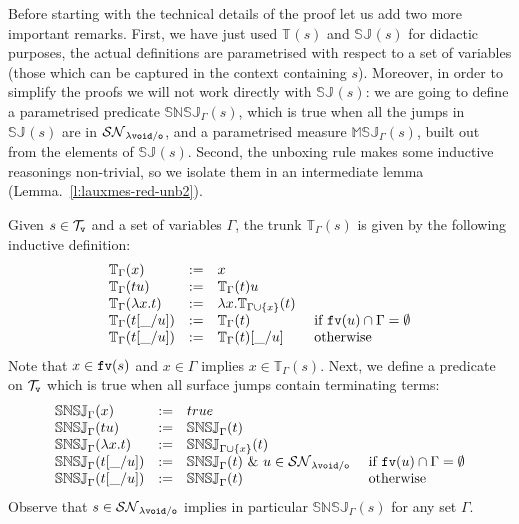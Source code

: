 \documentclass{LMCS}
\renewcommand{\>}{\rightarrow}
\def\lam{\lambda}
\def\Gam{\Gamma}
\newcommand{\SN}[1]{\mathcal{SN}_{#1}}
\newcommand{\fv}[1]{{\tt fv}(#1)}
\newcommand{\set}[1]{ \{ #1 \}}
\newcommand{\ems}{\emptyset}
\newcommand{\termsv}{\mathcal{T}_{\tt v}}
\newcommand{\modulo}[2]{#1/#2}
\newcommand{\osymb}{{\tt o}}
\newcommand{\aux}{{\tt void}}
\newcommand{\lauxm}{\lam\modulo{ \aux }{ \osymb }}
\newcommand{\snsudd}[2]{\mathbb{SNSJ}_{#1}(#2)}
\newcommand{\etamd}[2]{\mathbb{MSJ}_{#1}(#2)}
\newcommand{\surf}[2]{\mathbb{T}_{#1}(#2)}
\newcommand{\preetamd}[2]{\mathbb{SJ}_{#1}(#2)}
\newcommand{\void}{\_}
\begin{document}
Before starting with the technical details of the proof let us add two
more important remarks. First, we have just used $\surf{}{s}$ and
$\preetamd{}{s}$ for didactic purposes, the actual definitions are
parametrised with respect to a set of variables (those which can be
captured in the context containing $s$).  Moreover, in order to
simplify the proofs we will not work  directly with $\preetamd{}{s}$:
we are going to define a parametrised predicate $\snsudd{\Gam}{s}$,
which is true when all the jumps in $\preetamd{}{s}$ are in $\SN{\lauxm}$, and
a parametrised measure $\etamd{\Gam}{s}$,  built out from the elements
of $\preetamd{}{s}$.  Second, the unboxing rule makes some inductive
reasonings non-trivial, so we isolate them in an intermediate lemma
(Lemma.~\ref{l:lauxmes-red-unb2}).\medskip


Given $s \in \termsv$ and 
a set of variables $\Gam$, 
the trunk $\surf{\Gam}{s}$ is given by the following inductive definition:
\[ \begin{array}{llll}
   \surf{\Gam}{x}  &:=& x \\
   \surf{\Gam}{t u} &:=& \surf{\Gam}{t} u  \\
   \surf{\Gam}{\lam x. t} &:=& \lam x. \surf{\Gam \cup \set{x}}{t}\\
   \surf{\Gam}{t[\void/u]} &:=& \surf{\Gam}{t} 
        & \mbox{ if } \fv{u} \cap \Gam = \ems\\
   \surf{\Gam}{t[\void/u]} &:=& \surf{\Gam}{t}[\void/u] & \mbox{ otherwise } \\
   
   \end{array} \] 
Note that $x \in \fv{s}$ and $x \in \Gam$ implies
$x \in \surf{\Gam}{s}$. Next, we define a predicate on $\termsv$ which is true when all surface jumps contain terminating terms: 
\[ \begin{array}{llll}
   \snsudd{\Gam}{x}  &:=& true \\
   \snsudd{\Gam}{t u} &:=&  \snsudd{\Gam}{t} \\
   \snsudd{\Gam}{\lam x. t} &:=&  \snsudd{\Gam \cup \set{x}}{t}\\
    \snsudd{\Gam}{t[\void/u]} &:=&  \snsudd{\Gam}{t}\ \&\    u\in \SN{\lauxm}  
        & \mbox{ if } \fv{u} \cap \Gam = \ems\\
    \snsudd{\Gam}{t[\void/u]} &:=&  \snsudd{\Gam}{t} & \mbox{ otherwise } \\
    \end{array} \] 
Observe that $s \in \SN{\lauxm}$ implies in particular
$\snsudd{\Gam}{s}$ for any set $\Gam$.
\end{document}
